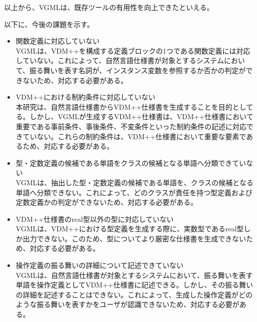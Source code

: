 以上から、VGMLは、既存ツールの有用性を向上できたといえる。

以下に、今後の課題を示す。

\begin{itemize}
	\item 関数定義に対応していない\\VGMLは、VDM++を構成する定義ブロックの1つである関数定義には対応していない。これによって、自然言語仕様書が対象とするシステムにおいて、振る舞いを表す名詞が、インスタンス変数を参照するか否かの判定ができないため、対応する必要がある。
	\item VDM++における制約条件に対応していない\\本研究は、自然言語仕様書からVDM++仕様書を生成することを目的としてる。しかし、VGMLが生成するVDM++仕様書は、VDM++仕様書において重要である事前条件、事後条件、不変条件といった制約条件の記述に対応できていない。これらの制約条件は、VDM++仕様書において重要な要素であるため、対応する必要がある。
	\item 型・定数定義の候補である単語をクラスの候補となる単語へ分類できていない\\VGMLは、抽出した型・定数定義の候補である単語を、クラスの候補となる単語へ分類できない。これによって、どのクラスが責任を持つ型定義および定数定義かの判定ができないため、対応する必要がある。
	\item VDM++仕様書のreal型以外の型に対応していない\\VGMLは、VDM++における型定義を生成する際に、実数型であるreal型しか出力できない。このため、型についてより厳密な仕様書を生成できないため、対応する必要がある。
	\item 操作定義の振る舞いの詳細について記述できていない\\VGMLは、自然言語仕様書が対象とするシステムにおいて、振る舞いを表す単語を操作定義としてVDM++仕様書に記述できる。しかし、その振る舞いの詳細を記述することはできない。これによって、生成した操作定義がどのような振る舞いを表すかをユーザが認識できないため、対応する必要がある。
\end{itemize}

